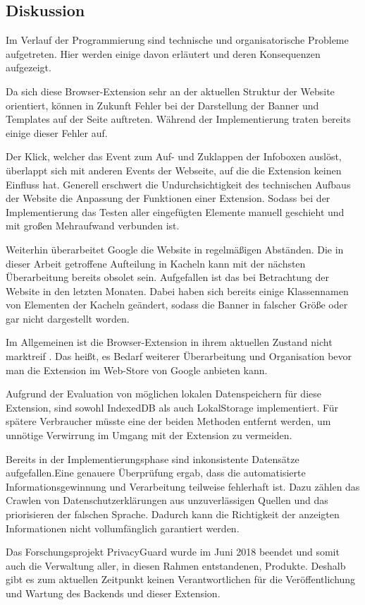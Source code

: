 \subsection{Diskussion}
\label{ss:diskussionht1}

Im Verlauf der Programmierung sind technische und organisatorische Probleme aufgetreten. Hier werden einige davon erläutert und deren Konsequenzen aufgezeigt.

Da sich diese Browser-Extension sehr an der aktuellen Struktur der Website orientiert, können in Zukunft Fehler bei der Darstellung der Banner und Templates auf der Seite auftreten. Während der Implementierung traten bereits einige dieser Fehler auf.

Der Klick, welcher das Event zum Auf- und Zuklappen der Infoboxen auslöst, überlappt sich mit anderen Events der Webseite, auf die die Extension keinen Einfluss hat. Generell erschwert die Undurchsichtigkeit des technischen Aufbaus der Website die Anpassung der Funktionen einer Extension. Sodass bei der Implementierung das Testen aller eingefügten Elemente manuell geschieht und mit großen Mehraufwand verbunden ist.

Weiterhin überarbeitet Google die Website in regelmäßigen Abständen. Die in dieser Arbeit getroffene Aufteilung in Kacheln kann mit der nächsten Überarbeitung bereits obsolet sein. Aufgefallen ist das bei Betrachtung der Website in den letzten Monaten. Dabei haben sich bereits einige Klassennamen von Elementen der Kacheln geändert, sodass die Banner in falscher Größe oder gar nicht dargestellt worden.

Im Allgemeinen ist die Browser-Extension in ihrem aktuellen Zustand nicht \glqq marktreif \grqq{}. Das heißt, es Bedarf weiterer Überarbeitung und Organisation bevor man die Extension im Web-Store von Google anbieten kann. 

Aufgrund der Evaluation von möglichen lokalen Datenspeichern für diese Extension, sind sowohl \glqq IndexedDB\grqq{} als auch \glqq LokalStorage\grqq{} implementiert. Für spätere Verbraucher müsste eine der beiden Methoden entfernt werden, um unnötige Verwirrung im Umgang mit der Extension zu vermeiden.

Bereits in der Implementierungsphase sind inkonsistente Datensätze aufgefallen.Eine genauere Überprüfung ergab, dass die automatisierte Informationsgewinnung und Verarbeitung teilweise fehlerhaft ist. Dazu zählen das Crawlen von Datenschutzerklärungen aus unzuverlässigen Quellen und das priorisieren der falschen Sprache. Dadurch kann die Richtigkeit der anzeigten Informationen nicht vollumfänglich garantiert werden.

Das Forschungsprojekt PrivacyGuard wurde im Juni 2018 beendet und somit auch die Verwaltung aller, in diesen Rahmen entstandenen, Produkte. Deshalb gibt es zum aktuellen Zeitpunkt keinen Verantwortlichen für die Veröffentlichung und Wartung des Backends und dieser Extension.